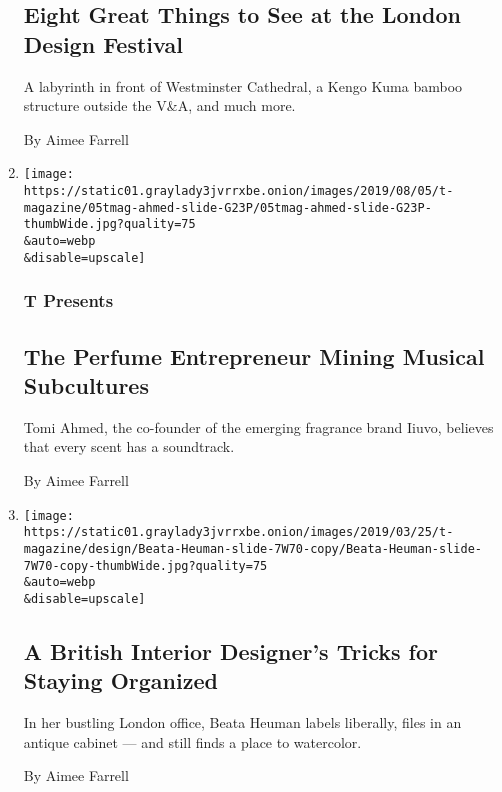 \begin{enumerate}
{  \subsection{Eight Great Things to See at the London Design
  Festival}\label{eight-great-things-to-see-at-the-london-design-festival}}

  A labyrinth in front of Westminster Cathedral, a Kengo Kuma bamboo
  structure outside the V\&A, and much more.

  By Aimee Farrell
\item
  \href{/2019/08/07/t-magazine/tomi-ahmed-iiuvo.html}{}

  \texttt{[image: https://static01.graylady3jvrrxbe.onion/images/2019/08/05/t-magazine/05tmag-ahmed-slide-G23P/05tmag-ahmed-slide-G23P-thumbWide.jpg?quality=75\\\&auto=webp\\\&disable=upscale]}

  \hypertarget{t-presents-1}{%
  \subsubsection{T Presents}\label{t-presents-1}}

  \hypertarget{the-perfume-entrepreneur-mining-musical-subcultures}{%
  \subsection{The Perfume Entrepreneur Mining Musical
  Subcultures}\label{the-perfume-entrepreneur-mining-musical-subcultures}}

  Tomi Ahmed, the co-founder of the emerging fragrance brand Iiuvo,
  believes that every scent has a soundtrack.

  By Aimee Farrell
\item
  \href{/2019/03/25/t-magazine/beata-heuman.html}{}

  \texttt{[image: https://static01.graylady3jvrrxbe.onion/images/2019/03/25/t-magazine/design/Beata-Heuman-slide-7W70-copy/Beata-Heuman-slide-7W70-copy-thumbWide.jpg?quality=75\\\&auto=webp\\\&disable=upscale]}

  \hypertarget{a-british-interior-designers-tricks-for-staying-organized}{%
  \subsection{A British Interior Designer's Tricks for Staying
  Organized}\label{a-british-interior-designers-tricks-for-staying-organized}}

  In her bustling London office, Beata Heuman labels liberally, files in
  an antique cabinet --- and still finds a place to watercolor.

  By Aimee Farrell
\end{enumerate}

